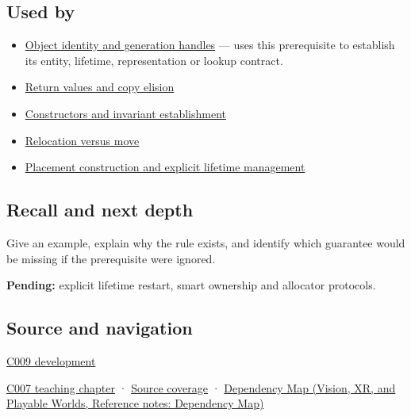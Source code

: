 \subsection{Used by}\label{appendix-a82f9c438857-used-by}

\begin{itemize}
\tightlist
\item
  \hyperref[appendix-f1581457d322]{Object identity and generation handles} --- uses this prerequisite to establish its entity, lifetime, representation or lookup contract.
\item
  \hyperref[appendix-b08d3788c5c6]{Return values and copy elision}
\item
  \hyperref[appendix-7f8ec83d0886]{Constructors and invariant establishment}
\item
  \hyperref[appendix-adfd6397af8d]{Relocation versus move}
\item
  \hyperref[appendix-f56c3e43fd4e]{Placement construction and explicit lifetime management}
\end{itemize}

\subsection{Recall and next depth}\label{appendix-a82f9c438857-recall-and-next-depth}

Give an example, explain why the rule exists, and identify which guarantee would be missing if the prerequisite were ignored.

\textbf{Pending:} explicit lifetime restart, smart ownership and allocator protocols.

\subsection{Source and navigation}\label{appendix-a82f9c438857-source-and-navigation}

\hyperref[appendix-fd090d982a15-m009---parts-127-147]{C009 development}

\hyperref[01-foundations-i-ch002-storage-is-a-place-an-object-is-its-occupant]{C007 teaching chapter} · \hyperref[appendix-fd090d982a15-m007---parts-101-112]{Source coverage} · \href{../07-Vision-XR-and-Playable-Worlds/main.pdf\#nameddest=appendix-4ad47bdd269a}{Dependency Map (Vision, XR, and Playable Worlds, Reference notes: Dependency Map)}
